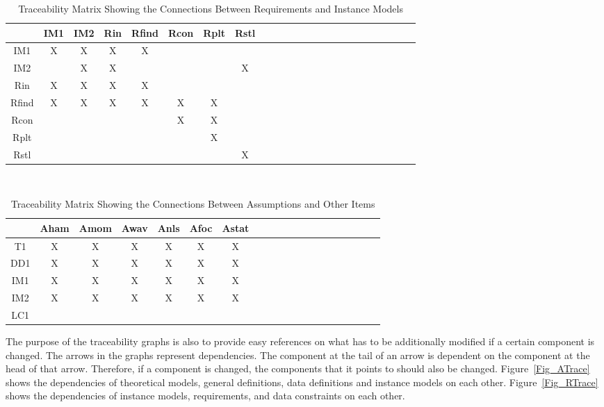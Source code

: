 \documentclass[12pt]{article}
\begin{document}
\begin{table}[h!]
	\centering
	\begin{tabular}{|c|c|c|c|c|c|c|c|c|c|c|c|c|c|c|c|c|c|c|c|c|c|c|c|}
		\hline        
		& IM1& IM2& Rin & Rfind & Rcon & Rplt & Rstl \\
		\hline
		IM1     &X &X &X &X & & &  \\ \hline
		IM2    & &X &X & & & &X \\ \hline
		Rin    &X &X &X &X & & & \\ \hline 
		Rfind    &X &X &X &X &X &X &    \\ \hline 
		Rcon   & & & & &X &X & \\ \hline
		Rplt   & & & & & &X & \\ \hline
		Rstl   & & & & & & &X \\
		\hline
	\end{tabular}\\
	\caption{Traceability Matrix Showing the Connections Between Requirements 
	and Instance Models}
	\label{Table:R_trace}
\end{table} 

\newpage
\begin{landscape}
	\begin{table}[h!]
		\centering
		\begin{tabular}{|c|c|c|c|c|c|c|c|c|c|c|c|c|c|c|c|c|c|c|c|}
			\hline
			& Aham & Amom& Awav& Anls& Afoc& Astat \\
			\hline
			T1        &X &X &X &X &X& X \\ \hline
			DD1       &X &X &X &X &X &X \\ \hline
			IM1       &X &X &X &X &X &X\\ \hline
			IM2       &X  &X  &X  &X  &X &X \\ \hline
			LC1       & & & & & & \\ 
			\hline
		\end{tabular}
		\caption{Traceability Matrix Showing the Connections Between 
		Assumptions and 
			Other Items}
		\label{Table:A_trace}
	\end{table}
\end{landscape}

The purpose of the traceability graphs is also to provide easy references on
what has to be additionally modified if a certain component is changed.  The
arrows in the graphs represent dependencies. The component at the tail of an
arrow is dependent on the component at the head of that arrow. Therefore, if a
component is changed, the components that it points to should also be
changed. Figure~\ref{Fig_ATrace} shows the dependencies of theoretical models,
general definitions, data definitions and instance models on each other. 
Figure~\ref{Fig_RTrace} shows the dependencies of
instance models, requirements, and data constraints on each other.
\end{document}
